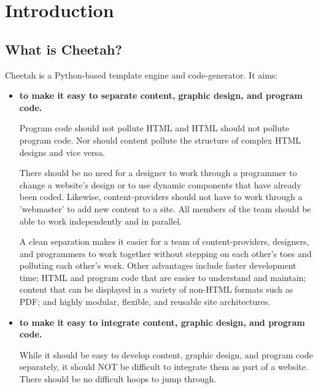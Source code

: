 \section{Introduction}
\label{intro}

\subsection{What is Cheetah?}
\label{intro.whatIs}

Cheetah is a Python-based template engine and code-generator.  It aims:

\begin{itemize}
\item {\bf to make it easy to separate content, graphic design, and program code.}
     
     Program code should not pollute HTML and HTML should not pollute program
     code. Nor should content pollute the structure of complex HTML designs and
     vice versa.

     There should be no need for a designer to work through a programmer to
     change a website's design or to use dynamic components that have already
     been coded.  Likewise, content-providers should not have to work through a
     'webmaster' to add new content to a site.  All members of the team should
     be able to work independently and in parallel.
     
     A clean separation makes it easier for a team of content-providers,
     designers, and programmers to work together without stepping on each
     other's toes and polluting each other's work. Other advantages include
     faster development time; HTML and program code that are easier to
     understand and maintain; content that can be displayed in a variety of
     non-HTML formats such as PDF; and highly modular, flexible, and reusable
     site architectures.       
     
\item {\bf to make it easy to integrate content, graphic design, and program code.}
     
     While it should be easy to develop content, graphic design, and program
     code separately, it should NOT be difficult to integrate them as part of a
     website.  There should be no difficult hoops to jump through.
     

\end{itemize}
